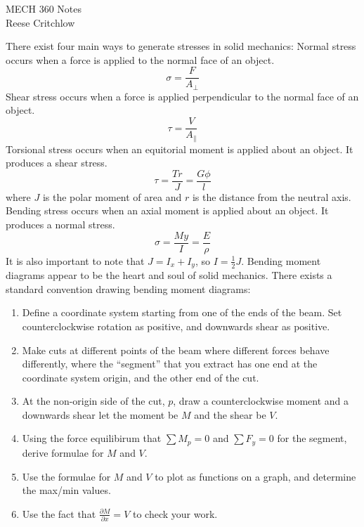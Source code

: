 \documentclass{article}
\begin{document}
\begin{center}
    \Large MECH 360 Notes\\
    \normalsize Reese Critchlow
\end{center}


There exist four main ways to generate stresses in solid mechanics:
\gap
{} Normal stress occurs when a force is applied to the normal
face of an object.
\[
    \sigma = \frac{F}{A_\perp}    
\]
 Shear stress occurs when a force is applied perpendicular
to the normal face of an object.
\[
    \tau = \frac{V}{A_\parallel}
\]
 Torsional stress occurs when an equitorial moment is applied
about an object. It produces a shear stress.
\[
    \tau = \frac{Tr}{J} = \frac{G\phi}{l}
\]
where $J$ is the polar moment of area and $r$ is the distance from the neutral axis.
\gap
{} Bending stress occurs when an axial moment is applied about
an object. It produces a normal stress.
\[
    \sigma = \frac{My}{I} = \frac{E}{\rho} 
\]
It is also important to note that $J = I_x + I_y$, so $I = \frac{1}{2} J$.
\gap
{}
Bending moment diagrams appear to be the heart and soul of solid mechanics. There exists
a standard convention drawing bending moment diagrams:
\begin{enumerate}
    \item Define a coordinate system starting from one of the ends of the beam. Set counterclockwise
    rotation as positive, and downwards shear as positive. 
    \item Make cuts at different points of the beam where different forces behave differently,
    where the ``segment'' that you extract has one end at the coordinate system origin,
    and the other end of the cut.
    \item At the non-origin side of the cut, $p$, draw a counterclockwise moment and a downwards shear
    let the moment be $M$ and the shear be $V$. 
    \item Using the force equilibirum that $\sum M_p = 0$ and $\sum F_y= 0$ for the 
    segment, derive formulae for $M$ and $V$.
    \item Use the formulae for $M$ and $V$ to plot as functions on a graph, and determine
    the max/min values.
    \item Use the fact that $\frac{\partial M}{\partial x} = V$ to check your work.
\end{enumerate}
\end{document}
